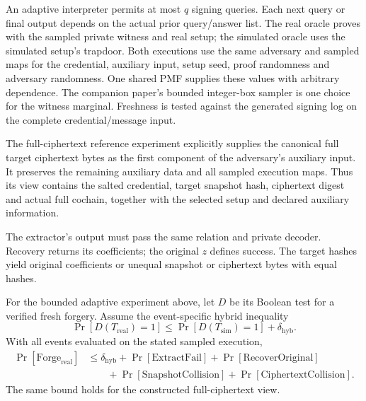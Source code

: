 An adaptive interpreter permits at most \(q\) signing queries. Each next
query or final output depends on the actual prior query/answer list. The real
oracle proves with the sampled private witness and real setup; the simulated
oracle uses the simulated setup's trapdoor. Both executions use the same
adversary and sampled maps for the credential, auxiliary input, setup seed,
proof randomness and adversary randomness. One shared PMF supplies these
values with arbitrary dependence. The companion paper's bounded integer-box
sampler is one choice for the witness marginal. Freshness is tested against
the generated signing log on the complete credential/message input.

The full-ciphertext reference experiment explicitly supplies the canonical full
target ciphertext bytes as the first component of the adversary's auxiliary
input. It preserves the remaining auxiliary data and all sampled execution
maps. Thus its view contains the salted credential, target snapshot hash,
ciphertext digest and actual full cochain, together with the selected setup
and declared auxiliary information.

\begin{samepage}
The extractor's output must pass the same relation and private decoder.
Recovery returns its coefficients; the original \(z\) defines success.
The target hashes yield original coefficients or unequal snapshot or
ciphertext bytes with equal hashes.\par
\end{samepage}

\begin{samepage}
\begin{theorem}
For the bounded adaptive experiment above, let \(D\) be its Boolean test for
a verified fresh forgery. Assume the event-specific hybrid inequality
\[
 \Pr[D(T_{\mathrm{real}})=1]
 \le \Pr[D(T_{\mathrm{sim}})=1]+\delta_{\mathrm{hyb}}.
\]
With all events evaluated on the stated sampled execution,
\begin{align*}
 \Pr[\mathrm{Forge}_{\mathrm{real}}]
 &\le \delta_{\mathrm{hyb}}+\Pr[\mathrm{ExtractFail}]
       +\Pr[\mathrm{RecoverOriginal}]\\
 &\qquad+\Pr[\mathrm{SnapshotCollision}]
       +\Pr[\mathrm{CiphertextCollision}].
\end{align*}
The same bound holds for the constructed full-ciphertext view.
\end{theorem}
\end{samepage}

